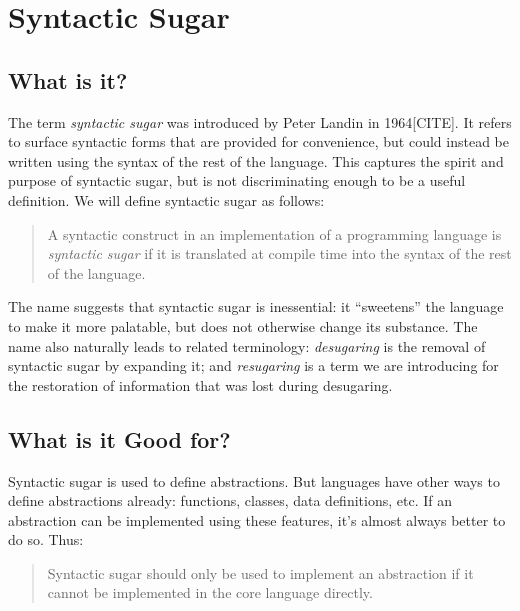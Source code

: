 \chapter{Syntactic Sugar}

\section{What is it?}

The term \emph{syntactic sugar} was introduced by Peter Landin in
1964[CITE]. It refers to surface syntactic forms that are provided for
convenience, but could instead be written using the syntax of the rest
of the language. This captures the spirit and purpose of syntactic
sugar, but is not discriminating enough to be a useful definition.
We will define syntactic sugar as follows:
\begin{quote}
  A syntactic construct in an implementation of a programming language
  is \emph{syntactic sugar} if it is translated at compile time into
  the syntax of the rest of the language.
\end{quote}

The name suggests that syntactic sugar is inessential: it ``sweetens''
the language to make it more palatable, but does not otherwise change
its substance. The name also naturally leads to related terminology:
\emph{desugaring} is the removal of syntactic sugar by expanding it;
and \emph{resugaring} is a term we are introducing for the restoration
of information that was lost during desugaring.

\section{What is it Good for?}

Syntactic sugar is used to define abstractions. But languages have
other ways to define abstractions already: functions, classes, data
definitions, etc. If an abstraction can be implemented using these
features, it's almost always better to do so. Thus:
\begin{quote}
  Syntactic sugar should only be used to implement an abstraction if
  it cannot be implemented in the core language directly.
\end{quote}

